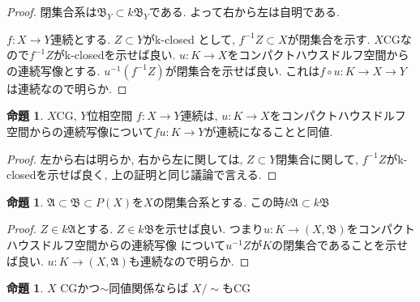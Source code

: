 \documentclass[dvipdfmx,a4paper,11pt]{article}
\theoremstyle{definition}
\newtheorem{prop}[thm]{命題}
\begin{document}
\begin{proof}
閉集合系は$\mathfrak{B}_Y \subset k\mathfrak{B}_Y$である.
よって右から左は自明である.

$f : X \to Y$連続とする. $Z \subset Y$がk-closed として, $f^{-1}Z \subset X$が閉集合を示す.
$X$CGなので$f^{-1}Z$がk-closedを示せば良い.
$u : K \to X$をコンパクトハウスドルフ空間からの連続写像とする.
$u^{-1}(f^{-1}Z )$が閉集合を示せば良い. これは$f \circ u : K \to X \to Y$は連続なので明らか.
\end{proof}

 \begin{tcolorbox}
 [colback = white, colframe = green!35!black, fonttitle = \bfseries,breakable = true]
\begin{prop}\cite[Prop1.11]{Str}
$X$CG, $Y$位相空間
$f : X \to Y$連続は, 
$u : K \to X$をコンパクトハウスドルフ空間からの連続写像について$fu : K \to Y$が連続になることと同値.
\end{prop}
\end{tcolorbox}

\begin{proof}
左から右は明らか, 右から左に関しては, 
$Z \subset Y$閉集合に関して, $f^{-1}Z$がk-closedを示せば良く, 上の証明と同じ議論で言える. 
\end{proof}

 \begin{tcolorbox}
 [colback = white, colframe = green!35!black, fonttitle = \bfseries,breakable = true]
\begin{prop}\cite[Prop1.12]{Str}
$\mathfrak{A} \subset \mathfrak{B} \subset P(X)$を$X$の閉集合系とする. 
この時$k\mathfrak{A} \subset k\mathfrak{B}$
\end{prop}
\end{tcolorbox}
\begin{proof}
$Z \in k\mathfrak{A} $とする. $Z \in k \mathfrak{B}$を示せば良い. 
つまり$u : K \to (X, \mathfrak{B})$をコンパクトハウスドルフ空間からの連続写像
について$u^{-1}Z$が$K$の閉集合であることを示せば良い. 
$u : K \to (X, \mathfrak{A})$も連続なので明らか.
\end{proof}

 \begin{tcolorbox}
 [colback = white, colframe = green!35!black, fonttitle = \bfseries,breakable = true]
\begin{prop}\cite[Prop2.1]{Str}
\label{Str-prop2.1}
$X$ CGかつ$\sim$同値関係ならば
$X/\sim$もCG
\end{prop}
\end{tcolorbox}
\end{document}
